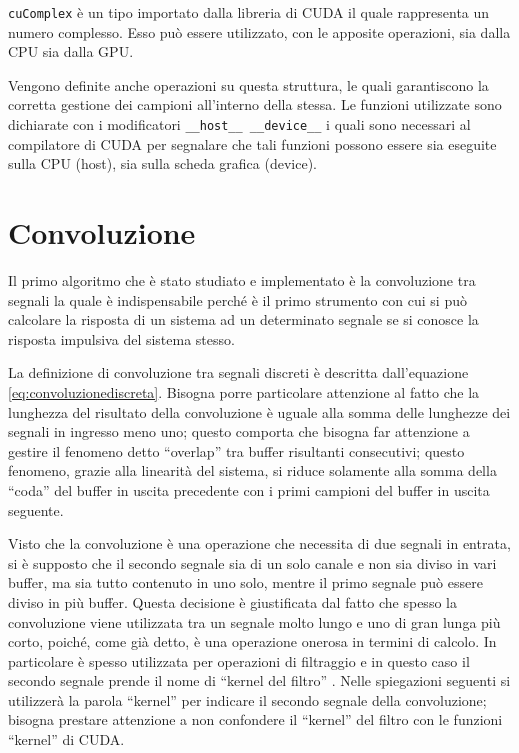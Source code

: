 \lstinline{cuComplex} è un tipo importato dalla libreria di CUDA il quale rappresenta un numero complesso. Esso può essere utilizzato, con le apposite operazioni, sia dalla CPU sia dalla GPU.

Vengono definite anche operazioni su questa struttura, le quali garantiscono la corretta gestione dei campioni all'interno della stessa. Le funzioni utilizzate sono dichiarate con i modificatori \lstinline{__host__ __device__} i quali sono necessari al compilatore di CUDA per segnalare che tali funzioni possono essere sia eseguite sulla CPU (host), sia sulla scheda grafica (device).

\section{Convoluzione}
Il primo algoritmo che è stato studiato e implementato è la convoluzione tra segnali la quale è indispensabile perché è il primo strumento con cui si può calcolare la risposta di un sistema ad un determinato segnale se si conosce la risposta impulsiva del sistema stesso.

La definizione di convoluzione tra segnali discreti è descritta dall'equazione \ref{eq:convoluzionediscreta}. Bisogna porre particolare attenzione al fatto che la lunghezza del risultato della convoluzione è uguale alla somma delle lunghezze dei segnali in ingresso meno uno; questo comporta che bisogna far attenzione a gestire il fenomeno detto ``overlap'' tra buffer risultanti consecutivi; questo fenomeno, grazie alla linearità del sistema, si riduce solamente alla somma della ``coda'' del buffer in uscita precedente con i primi campioni del buffer in uscita seguente.

Visto che la convoluzione è una operazione che necessita di due segnali in entrata, si è supposto che il secondo segnale sia di un solo canale e non sia diviso in vari buffer, ma sia tutto contenuto in uno solo, mentre il primo segnale può essere diviso in più buffer. Questa decisione è giustificata dal fatto che spesso la convoluzione viene utilizzata tra un segnale molto lungo e uno di gran lunga più corto, poiché, come già detto, è una operazione onerosa in termini di calcolo. In particolare è spesso utilizzata per operazioni di filtraggio e in questo caso il secondo segnale prende il nome di ``kernel del filtro'' \cite[p.~108]{dspguide}. Nelle spiegazioni seguenti si utilizzerà la parola ``kernel'' per indicare il secondo segnale della convoluzione; bisogna prestare attenzione a non confondere il ``kernel'' del filtro con le funzioni ``kernel'' di CUDA.

